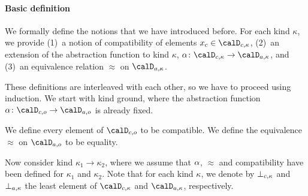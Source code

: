 \documentclass[../../diss.tex]{subfiles}
\begin{document}
\paragraph{Basic definition}

We formally define the notions that we have introduced before.
For each kind $\kappa$, we provide
(1)~a notion of compatibility of elements $\xc \in \domainc{\kappa}$,
(2)~an extension of the abstraction function to kind $\kappa$, \ie
        $\abs \colon \domainc{\kappa} \to \domaina{\kappa}$, and
(3)~an equivalence relation $\approx$ on $\domaina{\kappa}$.

These definitions are interleaved with each other, so we have to proceed using induction.
We start with kind ground, where the abstraction function $\abs \colon \domainc{\ground} \to \domaina{\ground}$ is already fixed.

\begin{definition}
    We define every element of $\domainc{\ground}$ to be compatible.
    We define the equivalence~$\approx$ on $\domaina{\ground}$ to be equality.
\end{definition}

Now consider kind $\kappa_1 \to \kappa_2$, where we assume that $\abs$, $\approx$ and compatibility have been defined for $\kappa_1$ and $\kappa_2$.
Note that for each kind $\kappa$, we denote by $\botc{\kappa}$ and $\bota{\kappa}$  the least element of $\domainc{\kappa}$ and $\domaina{\kappa}$, respectively.
\end{document}

